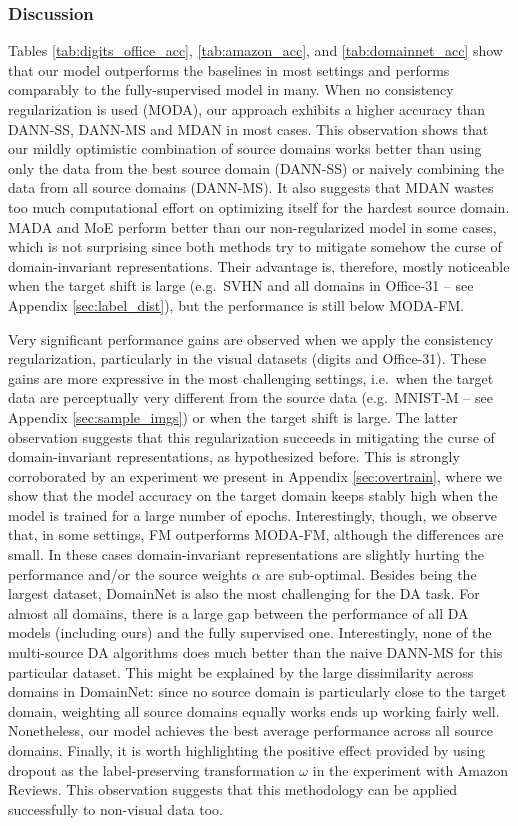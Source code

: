 \subsubsection{Discussion}
Tables \ref{tab:digits_office_acc}, \ref{tab:amazon_acc}, and \ref{tab:domainnet_acc} show that our model outperforms the baselines in most settings and performs comparably to the fully-supervised model in many. When no consistency regularization is used (MODA), our approach exhibits a higher accuracy than DANN-SS, DANN-MS and MDAN in most cases. This observation shows that our mildly optimistic combination of source domains works better than using only the data from the best source domain (DANN-SS) or naively combining the data from all source domains (DANN-MS). It also suggests that MDAN wastes too much computational effort on optimizing itself for the hardest source domain. MADA and MoE perform better than our non-regularized model in some cases, which is not surprising since both methods try to mitigate somehow the curse of domain-invariant representations. Their advantage is, therefore, mostly noticeable when the target shift is large (e.g.\ SVHN and all domains in Office-31 -- see Appendix \ref{sec:label_dist}), but the performance is still below MODA-FM.

Very significant performance gains are observed when we apply the consistency regularization, particularly in the visual datasets (digits and Office-31). These gains are more expressive in the most challenging settings, i.e.\ when the target data are perceptually very different from the source data (e.g.\ MNIST-M -- see Appendix \ref{sec:sample_imgs}) or when the target shift is large. The latter observation suggests that this regularization succeeds in mitigating the curse of domain-invariant representations, as hypothesized before. This is strongly corroborated by an experiment we present in Appendix \ref{sec:overtrain}, where we show that the model accuracy on the target domain keeps stably high when the model is trained for a large number of epochs. Interestingly, though, we observe that, in some settings, FM outperforms MODA-FM, although the differences are small. In these cases domain-invariant representations are slightly hurting the performance and/or the source weights $\alpha$ are sub-optimal. Besides being the largest dataset, DomainNet is also the most challenging for the DA task. For almost all domains, there is a large gap between the performance of all DA models (including ours) and the fully supervised one. Interestingly, none of the multi-source DA algorithms does much better than the naive DANN-MS for this particular dataset. This might be explained by the large dissimilarity across domains in DomainNet: since no source domain is particularly close to the target domain, weighting all source domains equally works ends up working fairly well. Nonetheless, our model achieves the best average performance across all source domains.  Finally, it is worth highlighting the positive effect provided by using dropout as the label-preserving transformation $\omega$ in the experiment with Amazon Reviews. This observation suggests that this methodology can be applied successfully to non-visual data too.

